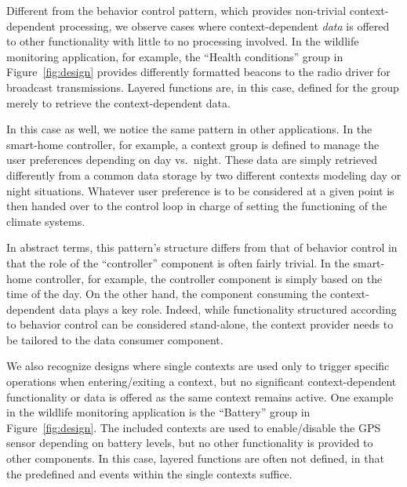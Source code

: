 


 Different from the behavior control
pattern, which provides non-trivial context-dependent processing, we
observe cases where context-dependent \emph{data} is offered to other
functionality with little to no processing involved. In the wildlife
monitoring application, for example, the ``Health conditions'' group
in Figure~\ref{fig:design} provides differently formatted beacons to
the radio driver for broadcast transmissions. Layered functions are,
in this case, defined for the group merely to retrieve the
context-dependent data.

In this case as well, we notice the same pattern in other
applications. In the smart-home controller, for example, a context
group is defined to manage the user preferences depending on day vs.\
night. These data are simply retrieved differently from a common data
storage by two different contexts modeling day or night
situations. Whatever user preference is to be considered at a given
point is then handed over to the control loop in charge of setting the
functioning of the climate systems.

In abstract terms, this pattern's structure differs from that of
behavior control in that the role of the ``controller'' component is
often fairly trivial. In the smart-home controller, for example, the
controller component is simply based on the time of the day. On the
other hand, the component consuming the context-dependent data plays a
key role. Indeed, while functionality structured according to behavior
control can be considered stand-alone, the context provider needs to
be tailored to the data consumer component.

 We also recognize designs where single contexts are
used only to trigger specific operations when entering/exiting a
context, but no significant context-dependent functionality or data is
offered as the same context remains active. One example in the wildlife
monitoring application is the ``Battery'' group in
Figure~\ref{fig:design}. The included contexts are used to
enable/disable the GPS sensor depending on battery levels, but no
other functionality is provided to other components. In this
case, layered functions are often not defined, in
that the predefined  and  events
within the single contexts suffice.


